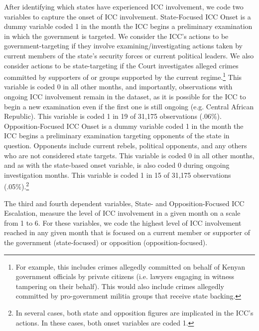 After identifying which states have experienced ICC involvement, we code two variables to capture the onset of ICC involvement.  State-Focused ICC Onset is a dummy variable coded 1 in the month the ICC begins a preliminary examination in which the government is targeted.  We consider the ICC’s actions to be government-targeting if they involve examining/investigating actions taken by current members of the state’s security forces or current political leaders.  We also consider actions to be state-targeting if the Court investigates alleged crimes committed by supporters of or groups supported by the current regime.\footnote{For example, this includes crimes allegedly committed on behalf of Kenyan government officials by private citizens (i.e. lawyers engaging in witness tampering on their behalf).  This would also include crimes allegedly committed by pro-government militia groups that receive state backing.} This variable is coded 0 in all other months, and importantly, observations with ongoing ICC involvement remain in the dataset, as it is possible for the ICC to begin a new examination even if the first one is still ongoing (e.g. Central African Republic).  This variable is coded 1 in 19 of 31,175 observations (.06\%).  Opposition-Focused ICC Onset is a dummy variable coded 1 in the month the ICC begins a preliminary examination targeting opponents of the state in question.  Opponents include current rebels, political opponents, and any others who are not considered state targets.  This variable is coded 0 in all other months, and as with the state-based onset variable, is also coded 0 during ongoing investigation months.  This variable is coded 1 in 15 of 31,175 observations (.05\%).\footnote{In several cases, both state and opposition figures are implicated in the ICC’s actions.  In these cases, both onset variables are coded 1.} 

The third and fourth dependent variables, State- and Opposition-Focused ICC Escalation, measure the level of ICC involvement in a given month on a scale from 1 to 6.  For these variables, we code the highest level of ICC involvement reached in any given month that is focused on a current member or supporter of the government (state-focused) or opposition (opposition-focused).  

